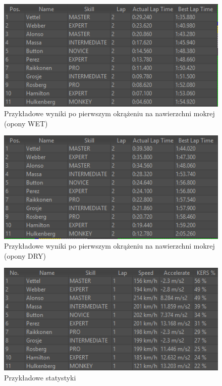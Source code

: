 \documentclass{article}
\begin{document}
\begin{figure}[h]
\begin{center}
\includegraphics[scale=0.8]{wet.png}
\caption{Przykładowe wyniki po pierwszym okrążeniu na nawierzchni mokrej (opony WET)}
\end{center}
\end{figure}

\begin{figure}[h]
\begin{center}
\includegraphics[scale=0.8]{wetdry.png}
\caption{Przykładowe wyniki po pierwszym okrążeniu na nawierzchni mokrej (opony DRY)}
\end{center}
\end{figure}

\begin{figure}[h]
\begin{center}
\includegraphics[scale=0.8]{stats.png}
\caption{Przykładowe statystyki}
\end{center}
\end{figure}
\end{document}

